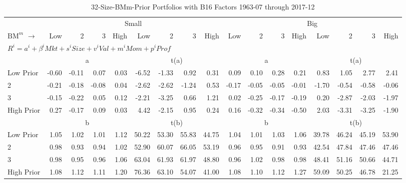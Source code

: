 
\begin{table}[!ht]
\footnotesize
\centering
\caption{32-Size-BMm-Prior Portfolios with B16 Factors 1963-07 through 2017-12}
\begin{tabular}{lrrrrrrrrrrrrrrrr}
  \toprule
     & \multicolumn{8}{c}{Small} & \multicolumn{8}{c}{Big}  \\
     \cmidrule(r){2-9} \cmidrule(r){10-17}
    $\text{BM}^{m}$ $\rightarrow$ & Low & 2 & 3 & High & Low & 2 & 3 & High & Low & 2 & 3 & High & Low & 2 & 3 & High  \\ 
  \midrule
  \multicolumn{17}{l}{$R^i=a^i+\beta^iMkt+s^iSize+v^iVal+m^iMom+p^iProf$}  \\
  
     & \multicolumn{4}{c}{a} & \multicolumn{4}{c}{t(a)}  & \multicolumn{4}{c}{a} & \multicolumn{4}{c}{t(a)}   \\
     \cmidrule(r){2-5} \cmidrule(r){6-9}  \cmidrule(r){10-13} \cmidrule(r){14-17} 
    Low Prior  & -0.60  & -0.11  & 0.07  & 0.03  & -6.52  & -1.33  & 0.92  & 0.31  & 0.09  & 0.10  & 0.28  & 0.21  & 0.83  & 1.05  & 2.77  & 2.41   \\
    2  & -0.21  & -0.18  & -0.08  & 0.04  & -2.62  & -2.62  & -1.24  & 0.53  & -0.17  & -0.05  & -0.05  & -0.01  & -1.70  & -0.54  & -0.58  & -0.06   \\
    3  & -0.15  & -0.22  & 0.05  & 0.12  & -2.21  & -3.25  & 0.66  & 1.21  & 0.02  & -0.25  & -0.17  & -0.19  & 0.20  & -2.87  & -2.03  & -1.97   \\
    High Prior  & 0.27  & -0.17  & 0.09  & 0.03  & 4.42  & -2.15  & 0.95  & 0.24  & 0.16  & -0.32  & -0.34  & -0.50  & 2.03  & -3.31  & -3.25  & -1.90   \\
    
  
     & \multicolumn{4}{c}{b} & \multicolumn{4}{c}{t(b)}  & \multicolumn{4}{c}{b} & \multicolumn{4}{c}{t(b)}   \\
     \cmidrule(r){2-5} \cmidrule(r){6-9}  \cmidrule(r){10-13} \cmidrule(r){14-17} 
    Low Prior  & 1.05  & 1.02  & 1.01  & 1.12  & 50.22  & 53.30  & 55.83  & 44.75  & 1.04  & 1.01  & 1.03  & 1.06  & 39.78  & 46.24  & 45.19  & 53.90   \\
    2  & 0.98  & 0.93  & 0.94  & 1.02  & 52.90  & 60.07  & 66.05  & 53.19  & 0.96  & 0.95  & 0.91  & 0.93  & 42.54  & 47.84  & 47.46  & 47.46   \\
    3  & 0.98  & 0.95  & 0.96  & 1.06  & 63.04  & 61.93  & 61.97  & 48.80  & 0.96  & 1.02  & 0.98  & 0.98  & 48.41  & 51.16  & 50.66  & 44.71   \\
    High Prior  & 1.08  & 1.12  & 1.11  & 1.20  & 76.36  & 63.10  & 54.07  & 41.00  & 1.08  & 1.10  & 1.12  & 1.27  & 59.09  & 50.25  & 46.78  & 21.25   \\
    

\end{tabular}
\end{table}

